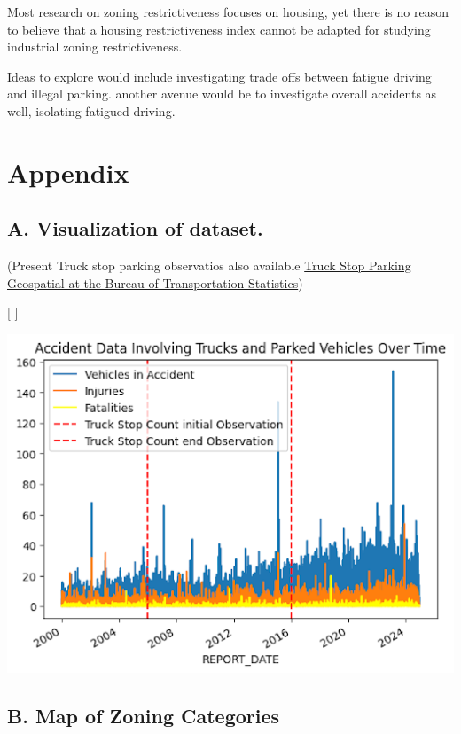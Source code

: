 \documentclass[
  12pt]{article}
\begin{document}
Most research on zoning restrictiveness focuses on housing, yet there is
no reason to believe that a housing restrictiveness index cannot be
adapted for studying industrial zoning restrictiveness.

Ideas to explore would include investigating trade offs between fatigue
driving and illegal parking. another avenue would be to investigate
overall accidents as well, isolating fatigued driving.

\section{\texorpdfstring{\textbf{Appendix}}{Appendix}}\label{appendix}

\subsection{\texorpdfstring{\textbf{A. Visualization of
dataset.}}{A. Visualization of dataset.}}\label{sec-a.-visualization-of-dataset.-}

(Present Truck stop parking observatios also available
\href{https://data-usdot.opendata.arcgis.com/datasets/usdot::truck-stop-parking/about}{Truck
Stop Parking \textbar{} Geospatial at the Bureau of Transportation
Statistics})

{[} \citet{coWilliamClintCResearchProposalTrucks2024}{]}

\includegraphics{images/unnamed.png}

\subsection{B. Map of Zoning
Categories}\label{sec-b.-map-of-zoning-categories}
\end{document}
